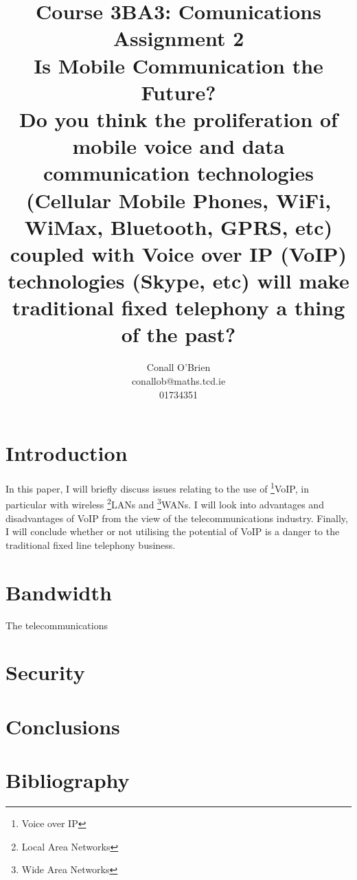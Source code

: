 \documentclass[a4paper,12pt]{article}
\begin{document}
\title{Course 3BA3: Comunications \\ \vspace{10mm} Assignment 2 \\
\vspace{10mm} Is Mobile Communication the Future? \\ \vspace{10mm}
{\small Do you think the proliferation of mobile voice and data communication
technologies (Cellular Mobile Phones, WiFi, WiMax, Bluetooth, GPRS, etc)
coupled with Voice over IP (VoIP) technologies (Skype, etc) will make
traditional fixed telephony a thing of the past?}}

\author{Conall O'Brien \\ conallob@maths.tcd.ie \\ 01734351}

\maketitle

\section{Introduction}

In this paper, I will briefly discuss issues relating to the use of
\footnote{Voice over IP}{VoIP}, in particular with wireless 
\footnote{Local Area Networks}{LANs} and 
\footnote{Wide Area Networks}{WANs}. I will look into advantages
and disadvantages of VoIP from the view of the telecommunications 
industry. Finally, I will conclude whether or not utilising the
potential of VoIP is a danger to the traditional fixed line telephony
business.

\section{Bandwidth}

The telecommunications 

\section{Security}



\section{}


\section{Conclusions}



\section{Bibliography}




\end{document}
